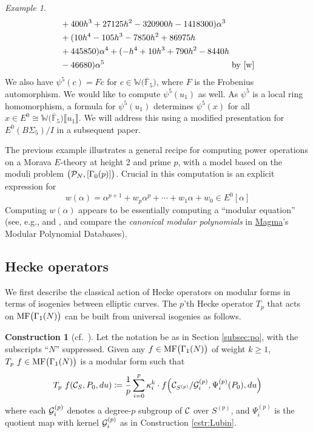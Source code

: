 \documentclass{gtpart}
\theoremstyle{definition}
\newtheorem{cstr}[equation]{Construction}
\theoremstyle{remark}
\newtheorem{ex}[equation]{Example}
\newcommand{\mb}[1]{\mathbb{#1}}
\newcommand{\cF}{\overline {\mb F}}
\newcommand{\CC}{{\cal C}}
\newcommand{\CG}{{\cal G}}
\newcommand{\CP}{{\cal P}}
\newcommand{\BW}{{\mb W}}
\newcommand{\MF}{{\rm MF}}
\newcommand{\A}{\alpha}
\newcommand{\G}{\Gamma}
\newcommand{\K}{\kappa}
\newcommand{\ce}{\coloneqq}
\newcommand{\lb}{\llbracket}
\newcommand{\rb}{\rrbracket}
\renewcommand{\=}{\approx}
\renewcommand{\-}{\sim}
\numberwithin{equation}{section}
\begin{document}
\begin{ex}
\begin{equation}
\begin{split}
               & + 400 h^3 + 27125 h^2 - 320900 h - 1418300) \A^3 \\
               & + (10 h^4 - 105 h^3 - 7850 h^2 + 86975 h \\
               & + 445850) \A^4 + (-h^4 + 10 h^3 + 790 h^2 - 8440 h \\
               & - 46680) \A^5 
                 \qquad\qquad\qquad\qquad\qquad\qquad\qquad~~~ 
                 \text{by \eqref{w}} 
  \end{split}
 \end{equation}
 We also have $\psi^5(c) = F c$ for $c \in \BW \big( \cF_5 \big)$, where $F$ is 
 the Frobenius automorphism.  We would like to compute $\psi^5(u_1)$ as well.  
 As $\psi^5$ is a local ring homomorphism, a formula for $\psi^5(u_1)$ 
 determines $\psi^5(x)$ for all 
 $x \in E^0 \cong \BW \big( \cF_5 \big) \lb u_1 \rb$.  We will address this 
 using a modified presentation for $E^0(B\Sigma_5) / I$ in a subsequent paper.  
\end{ex}

The previous example illustrates a general recipe for computing power operations 
on a Morava $E$-theory at height 2 and prime $p$, with a model based on the 
moduli problem $\big(\CP_N,[\G_0(p)]\big)$.  Crucial in this computation is an 
explicit expression for 
\begin{equation}
 \label{generalw}
 w(\A) = \A^{p + 1} + w_p \A^p + \cdots + w_1 \A + w_0 \in E^0[\A] 
\end{equation}
Computing $w(\A)$ appears to be essentially computing a ``modular equation'' 
(see, e.g., \cite[II.6]{Milne} and \cite{MO}, and compare the {\em canonical 
modular polynomials} in 
\href{http://magma.maths.usyd.edu.au/magma/handbook/modular_curves}{Magma}'s 
Modular Polynomial Databases).  



\subsection{Hecke operators}
\label{subsec:ho}

We first describe the classical action of Hecke operators on modular forms in 
terms of isogenies between elliptic curves.  The $p$'th Hecke operator $T_p$ 
that acts on $\MF\big(\G_1(N)\big)$ can be built from universal isogenies as 
follows.  

\begin{cstr}[{cf.~\cite[(1.11.0.2)]{padicprop}}]
 \label{cstr:Hecke}
 Let the notation be as in Section \ref{subsec:po}, with the subscripts ``$N$'' 
 suppressed.  Given any $f \in \MF\big(\G_1(N)\big)$ of weight $k \geq 1$, 
 $T_p~f \in \MF\big(\G_1(N)\big)$ is a modular form such that 
 \begin{equation}
  \label{Tp}
  T_p~f(\CC_S, P_0, du) \ce \frac{1}{p} \sum_{i = 0}^p \K_i^k \cdot 
  f\!\left(\CC_{S^{(p)}}/\CG^{(p)}_i, \Psi^{(p)}_i(P_0), du\right) 
 \end{equation}
 where each $\CG^{(p)}_i$ denotes a degree-$p$ subgroup of $\CC$ over $S^{(p)}$, 
 and $\Psi^{(p)}_i$ is the quotient map with kernel $\CG^{(p)}_i$ as in 
 Construction \ref{cstr:Lubin}.  
\end{cstr}
\end{document}
